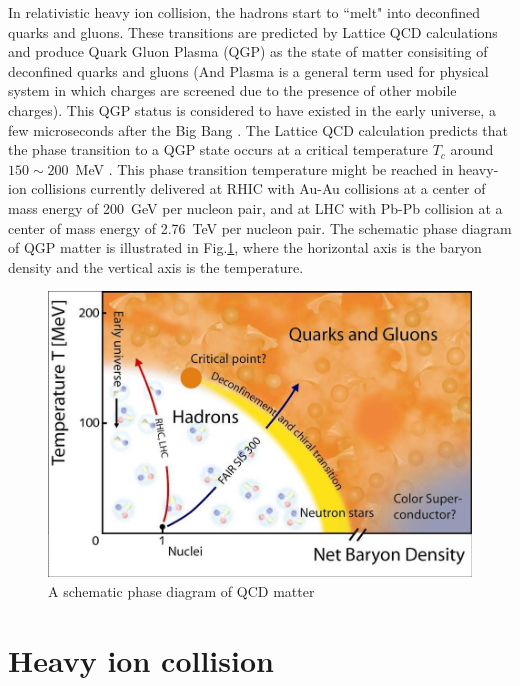 In relativistic heavy ion collision, the hadrons start to ``melt" into deconfined quarks and gluons. These transitions are predicted by Lattice QCD calculations \cite{Adams:2005dq} and produce Quark Gluon Plasma (QGP) as the state of matter consisiting of deconfined quarks and gluons (And Plasma is a general term used for physical system in which charges are screened due to the presence of other mobile charges). This QGP status is considered to have existed in the early universe, a few microseconds after the Big Bang \cite{PhysRevLett.34.1353, CABIBBO197567}. The Lattice QCD calculation predicts that the phase transition to a QGP state occurs at a critical temperature $T_c$ around $150\sim200$~MeV \cite{karsch}. This phase transition temperature might be reached in heavy-ion collisions currently delivered at RHIC with Au-Au collisions at a center of mass energy of 200~GeV per nucleon pair, and at LHC with Pb-Pb collision at a center of mass energy of 2.76~TeV per nucleon pair. The schematic phase diagram of QGP matter is illustrated in Fig.\ref{fig1}, where the horizontal axis is the baryon density and the vertical axis is the temperature. 
	
	
\begin{figure}[ht]
\centerline{\includegraphics[width=14.0cm]{figures/Phasendiagram}}
\caption{A schematic phase diagram of QCD matter \cite{fig_phase_dia}}
\label{fig1}
\end{figure}



\section{Heavy ion collision}

